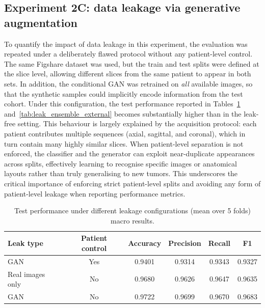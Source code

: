 \subsection{Experiment 2C: data leakage via generative augmentation}

To quantify the impact of data leakage in this experiment, the evaluation was repeated under a deliberately flawed protocol without any patient-level control. The same Figshare dataset was used, but the train and test splits were defined at the slice level, allowing different slices from the same patient to appear in both sets. In addition, the conditional GAN was retrained on \emph{all} available images, so that the synthetic samples could implicitly encode information from the test cohort. Under this configuration, the test performance reported in Tables~\ref{tab:external_leak_configs} and~\ref{tab:leak_ensemble_external} becomes substantially higher than in the leak-free setting. This behaviour is largely explained by the acquisition protocol: each patient contributes multiple sequences (axial, sagittal, and coronal), which in turn contain many highly similar slices. When patient-level separation is not enforced, the classifier and the generator can exploit near-duplicate appearances across splits, effectively learning to recognise specific images or anatomical layouts rather than truly generalising to new tumors. This underscores the critical importance of enforcing strict patient-level splits and avoiding any form of patient-level leakage when reporting performance metrics.\\


\begin{table}[ht]
\centering
\caption{Test performance under different leakage configurations (mean over 5 folds) macro results.}
\begin{tabular}{lccccc}
\toprule
\textbf{Leak type} & \textbf{Patient control} & \textbf{Accuracy} & \textbf{Precision} & \textbf{Recall} & \textbf{F1} \\
\midrule
GAN                 & Yes  & 0.9401 & 0.9314 & 0.9343 & 0.9327 \\
Real images only          & No   & 0.9680 & 0.9626 & 0.9647 & 0.9635 \\
GAN                 & No   & 0.9722 & 0.9699 & 0.9670 & 0.9683 \\
\bottomrule
\end{tabular}
\label{tab:external_leak_configs}
\end{table}



